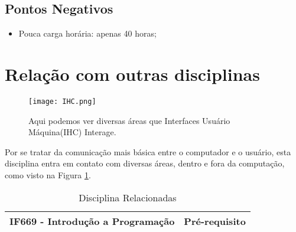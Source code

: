 \documentclass[a4paper]{article}
\begin{document}
\subsection{Pontos Negativos}

\begin{itemize}
\item Pouca carga horária: apenas 40 horas;
\end{itemize}

\section{Relação com outras disciplinas}

\begin{figure}[t]
\centering
\texttt{[image: IHC.png]}
\caption{\label{fig:IHC}\cite{fig_IUM}Aqui podemos ver diversas áreas que Interfaces Usuário Máquina(IHC) Interage.}
\end{figure}

Por se tratar da comunicação mais básica entre o computador e o usuário, esta disciplina entra em contato com diversas áreas, dentro e fora da computação, como visto na Figura \ref{fig:IHC}.

\begin{table}[h]
\centering
\caption{Disciplina Relacionadas\cite{perfil}}
\label{Table}
\begin{tabular}{|l|l|}
\hline
IF669 - Introdução a Programação & Pré-requisito \\ \hline
\end{tabular}
\end{table}



\end{document}
